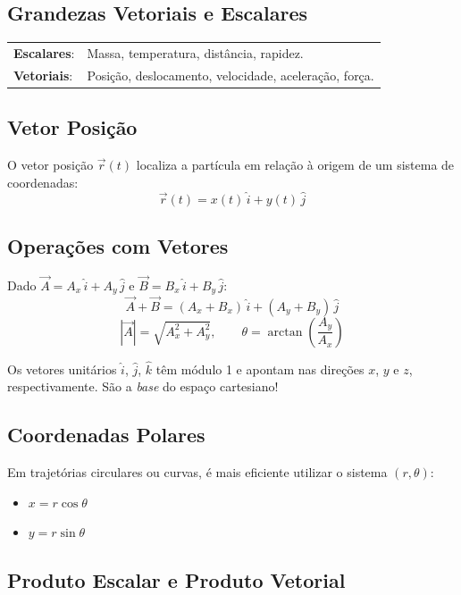 \documentclass[10.5pt, a4paper]{extarticle}
\begin{document}
\subsection{Grandezas Vetoriais e Escalares}

\begin{definicaobox}
\begin{tabular}{ll}
  \textbf{Escalares}: & Massa, temperatura, distância, rapidez. \\
  \textbf{Vetoriais}: & Posição, deslocamento, velocidade, aceleração, força.
\end{tabular}
\end{definicaobox}

\subsection{Vetor Posição}

O vetor posição $\vec{r}(t)$ localiza a partícula em relação à origem de um sistema de coordenadas:
\[
  \vec{r}(t) = x(t)\,\hat{i} + y(t)\,\hat{j}
\]

\subsection{Operações com Vetores}

Dado $\vec{A} = A_x\,\hat{i} + A_y\,\hat{j}$ e $\vec{B} = B_x\,\hat{i} + B_y\,\hat{j}$:
\[
  \vec{A} + \vec{B} = (A_x + B_x)\,\hat{i} + (A_y + B_y)\,\hat{j}
\]
\[
  |\vec{A}| = \sqrt{A_x^2 + A_y^2}, \qquad
  \theta = \arctan\!\left(\frac{A_y}{A_x}\right)
\]

\begin{pikabox}
Os vetores unitários $\hat{i}$, $\hat{j}$, $\hat{k}$ têm módulo 1 e apontam nas direções $x$, $y$ e $z$, respectivamente. São a \emph{base} do espaço cartesiano!
\end{pikabox}

\subsection{Coordenadas Polares}

Em trajetórias circulares ou curvas, é mais eficiente utilizar o sistema $(r, \theta)$:
\begin{itemize}[nosep]
  \item $x = r\cos\theta$
  \item $y = r\sin\theta$
\end{itemize}

\subsection{Produto Escalar e Produto Vetorial}
\end{document}
